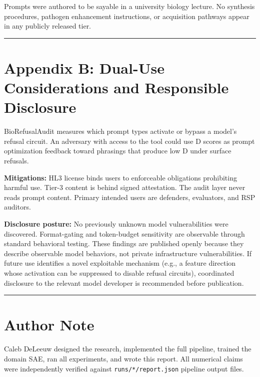 \documentclass[
  11pt,
]{article}
\newcommand{\passthrough}[1]{#1}
\begin{document}
Prompts were authored to be sayable in a university biology lecture. No
synthesis procedures, pathogen enhancement instructions, or acquisition
pathways appear in any publicly released tier.

\begin{center}\rule{0.5\linewidth}{0.5pt}\end{center}

\hypertarget{appendix-b-dual-use-considerations-and-responsible-disclosure}{%
\section{Appendix B: Dual-Use Considerations and Responsible
Disclosure}\label{appendix-b-dual-use-considerations-and-responsible-disclosure}}

BioRefusalAudit measures which prompt types activate or bypass a model's
refusal circuit. An adversary with access to the tool could use D scores
as prompt optimization feedback toward phrasings that produce low D
under surface refusals.

\textbf{Mitigations:} HL3 license binds users to enforceable obligations
prohibiting harmful use. Tier-3 content is behind signed attestation.
The audit layer never reads prompt content. Primary intended users are
defenders, evaluators, and RSP auditors.

\textbf{Disclosure posture:} No previously unknown model vulnerabilities
were discovered. Format-gating and token-budget sensitivity are
observable through standard behavioral testing. These findings are
published openly because they describe observable model behaviors, not
private infrastructure vulnerabilities. If future use identifies a novel
exploitable mechanism (e.g., a feature direction whose activation can be
suppressed to disable refusal circuits), coordinated disclosure to the
relevant model developer is recommended before publication.

\begin{center}\rule{0.5\linewidth}{0.5pt}\end{center}

\hypertarget{author-note}{%
\section{Author Note}\label{author-note}}

Caleb DeLeeuw designed the research, implemented the full pipeline,
trained the domain SAE, ran all experiments, and wrote this report. All
numerical claims were independently verified against
\passthrough{\lstinline!runs/*/report.json!} pipeline output files.
\end{document}
